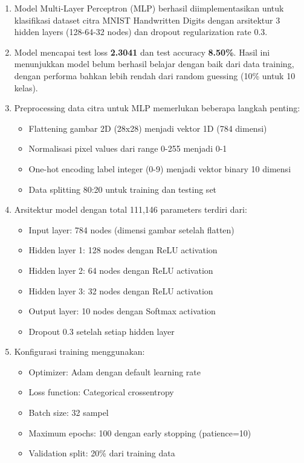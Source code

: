 \documentclass[12pt,a4paper]{article}
\begin{document}
\begin{enumerate}
    \item Model Multi-Layer Perceptron (MLP) berhasil diimplementasikan untuk klasifikasi dataset citra MNIST Handwritten Digits dengan arsitektur 3 hidden layers (128-64-32 nodes) dan dropout regularization rate 0.3.
    
    \item Model mencapai test loss \textbf{2.3041} dan test accuracy \textbf{8.50\%}. Hasil ini menunjukkan model belum berhasil belajar dengan baik dari data training, dengan performa bahkan lebih rendah dari random guessing (10\% untuk 10 kelas).
    
    \item Preprocessing data citra untuk MLP memerlukan beberapa langkah penting:
    \begin{itemize}
        \item Flattening gambar 2D (28x28) menjadi vektor 1D (784 dimensi)
        \item Normalisasi pixel values dari range 0-255 menjadi 0-1
        \item One-hot encoding label integer (0-9) menjadi vektor binary 10 dimensi
        \item Data splitting 80:20 untuk training dan testing set
    \end{itemize}
    
    \item Arsitektur model dengan total 111,146 parameters terdiri dari:
    \begin{itemize}
        \item Input layer: 784 nodes (dimensi gambar setelah flatten)
        \item Hidden layer 1: 128 nodes dengan ReLU activation
        \item Hidden layer 2: 64 nodes dengan ReLU activation
        \item Hidden layer 3: 32 nodes dengan ReLU activation
        \item Output layer: 10 nodes dengan Softmax activation
        \item Dropout 0.3 setelah setiap hidden layer
    \end{itemize}
    
    \item Konfigurasi training menggunakan:
    \begin{itemize}
        \item Optimizer: Adam dengan default learning rate
        \item Loss function: Categorical crossentropy
        \item Batch size: 32 sampel
        \item Maximum epochs: 100 dengan early stopping (patience=10)
        \item Validation split: 20\% dari training data
    \end{itemize}
    

\end{enumerate}
\end{document}
